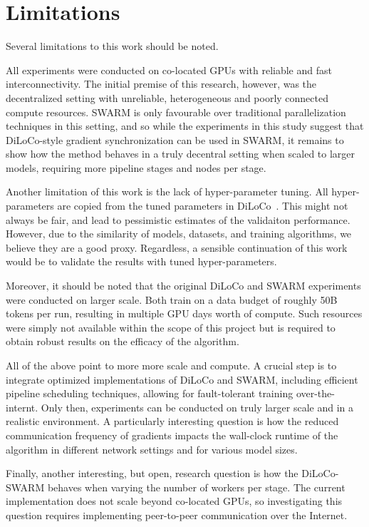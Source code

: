 \documentclass{article}
\begin{document}
\section{Limitations}

Several limitations to this work should be noted.

All experiments were conducted on co-located GPUs with reliable and fast
interconnectivity. The initial premise of this research, however, was the
decentralized setting with unreliable, heterogeneous and poorly connected
compute resources. SWARM is only favourable over traditional parallelization
techniques in this setting, and so while the experiments in this study suggest
that DiLoCo-style gradient synchronization can be used in SWARM, it remains to
show how the method behaves in a truly decentral setting when scaled to larger
models, requiring more pipeline stages and nodes per stage.

Another limitation of this work is the lack of hyper-parameter tuning. All
hyper-parameters are copied from the tuned parameters in
DiLoCo~\cite{douillard2023diloco}. This might not always be fair, and lead to
pessimistic estimates of the validaiton performance. However, due to the
similarity of models, datasets, and training algorithms, we believe they are a
good proxy. Regardless, a sensible continuation of this work would be to
validate the results with tuned hyper-parameters.

Moreover, it should be noted that the original DiLoCo and SWARM experiments were
conducted on larger scale. Both train on a data budget of roughly 50B tokens per
run, resulting in multiple GPU days worth of compute. Such resources were simply
not available within the scope of this project but is required to obtain robust
results on the efficacy of the algorithm.

All of the above point to more more scale and compute. A crucial step is to
integrate optimized implementations of DiLoCo and SWARM, including efficient
pipeline scheduling techniques, allowing for fault-tolerant training over-the-
internt. Only then, experiments can be conducted on truly larger scale and in a
realistic environment. A particularly interesting question is how the reduced
communication frequency of gradients impacts the wall-clock runtime of the
algorithm in different network settings and for various model sizes.

Finally, another interesting, but open, research question is how the
DiLoCo-SWARM behaves when varying the number of workers per stage. The current
implementation does not scale beyond co-located GPUs, so investigating this
question requires implementing peer-to-peer communication over the Internet.
\end{document}
